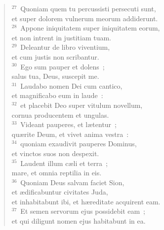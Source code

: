 \begin{flushleft}
\begin{verse}
${}^{27}$~Quoniam quem tu percussisti persecuti sunt,\\ et super dolorem vulnerum meorum addiderunt.\\
${}^{28}$~Appone iniquitatem super iniquitatem eorum,\\ et non intrent in justitiam tuam.\\
${}^{29}$~Deleantur de libro viventium,\\ et cum justis non scribantur.\\
${}^{30}$~Ego sum pauper et dolens~;\\ salus tua, Deus, suscepit me.\\
${}^{31}$~Laudabo nomen Dei cum cantico,\\ et magnificabo eum in laude~:\\
${}^{32}$~et placebit Deo super vitulum novellum,\\ cornua producentem et ungulas.\\
${}^{33}$~Videant pauperes, et l\ae tentur~;\\ qu\ae rite Deum, et vivet anima vestra~:\\
${}^{34}$~quoniam exaudivit pauperes Dominus,\\ et vinctos suos non despexit.\\
${}^{35}$~Laudent illum c\ae li et terra~;\\ mare, et omnia reptilia in eis.\\
${}^{36}$~Quoniam Deus salvam faciet Sion,\\ et \ae dificabuntur civitates Juda,\\ et inhabitabunt ibi, et h\ae reditate acquirent eam.\\
${}^{37}$~Et semen servorum ejus possidebit eam~;\\ et qui diligunt nomen ejus habitabunt in ea.\end{verse}\end{flushleft}



